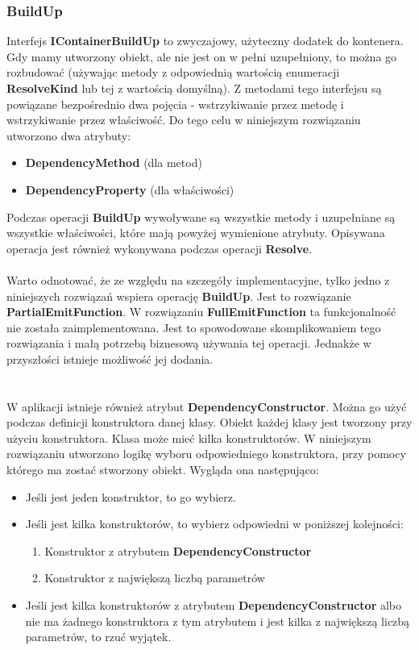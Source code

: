 \documentclass[12pt]{article}
\begin{document}
\subsubsection{BuildUp}
Interfejs \textbf{IContainerBuildUp} to zwyczajowy, użyteczny dodatek do kontenera. Gdy mamy utworzony obiekt, ale nie jest on w pełni uzupełniony, to można go rozbudować (używając metody z odpowiednią wartością enumeracji \textbf{ResolveKind} lub tej z wartością domyślną). Z metodami tego interfejsu są powiązane bezpośrednio dwa pojęcia - wstrzykiwanie przez metodę i wstrzykiwanie przez właściwość. Do tego celu w niniejszym rozwiązaniu utworzono dwa atrybuty:
\begin{itemize}
	\item \textbf{DependencyMethod} (dla metod)
	\item \textbf{DependencyProperty} (dla właściwości)
\end{itemize}
Podczas operacji \textbf{BuildUp} wywoływane są wszystkie metody i uzupełniane są wszystkie właściwości, które mają powyżej wymienione atrybuty. Opisywana operacja jest również wykonywana podczas operacji \textbf{Resolve}.\\
\\
Warto odnotować, że ze względu na szczegóły implementacyjne, tylko jedno z niniejszych rozwiązań wspiera operację \textbf{BuildUp}. Jest to rozwiązanie \textbf{PartialEmitFunction}. W rozwiązaniu \textbf{FullEmitFunction} ta funkcjonalność nie została zaimplementowana. Jest to spowodowane skomplikowaniem tego rozwiązania i małą potrzebą biznesową używania tej operacji. Jednakże w przyszłości istnieje możliwość jej dodania.\\
\\
\\
W aplikacji istnieje również atrybut \textbf{DependencyConstructor}. Można go użyć podczas definicji konstruktora danej klasy. Obiekt każdej klasy jest tworzony przy użyciu konstruktora. Klasa może mieć kilka konstruktorów. W niniejszym rozwiązaniu utworzono logikę wyboru odpowiedniego konstruktora, przy pomocy którego ma zostać stworzony obiekt. Wygląda ona następująco:
\begin{itemize}
	\item Jeśli jest jeden konstruktor, to go wybierz.
	\item Jeśli jest kilka konstruktorów, to wybierz odpowiedni w poniższej kolejności:
	\begin{enumerate}
		\item Konstruktor z atrybutem \textbf{DependencyConstructor}
		\item Konstruktor z największą liczbą parametrów
	\end{enumerate}
	\item Jeśli jest kilka konstruktorów z atrybutem \textbf{DependencyConstructor} albo nie ma żadnego konstruktora z tym atrybutem i jest kilka z największą liczbą parametrów, to rzuć wyjątek.
\end{itemize}
\end{document}
